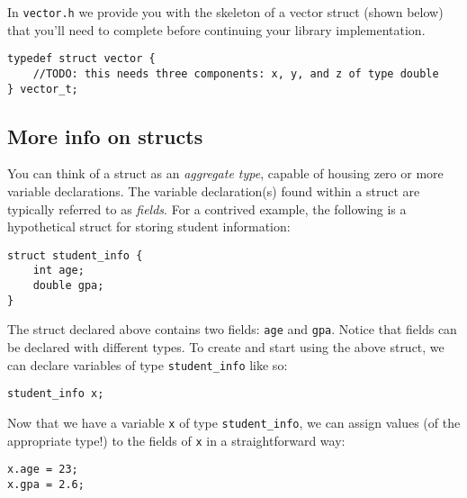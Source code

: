 \documentclass[12pt]{article}
\begin{document}
In \texttt{vector.h} we provide you with the skeleton of a vector struct (shown below) that you'll need to complete before continuing your library implementation.

\begin{mdframed}[backgroundcolor=light-gray, innerleftmargin=10, innertopmargin=1,innerbottommargin=1,linecolor=light-gray]
\begin{lstlisting}
typedef struct vector {
    //TODO: this needs three components: x, y, and z of type double
} vector_t;
\end{lstlisting}
\end{mdframed} 

\subsection{More info on structs}

You can think of a struct as an \textit{aggregate type}, capable of housing zero or more variable declarations. The variable declaration(s) found within a struct are typically referred to as \textit{fields}. For a contrived example, the following is a hypothetical struct for storing student information:

\begin{mdframed}[backgroundcolor=light-gray, innerleftmargin=10, innertopmargin=1,innerbottommargin=1,linecolor=light-gray]
\begin{lstlisting}
struct student_info {
    int age;
    double gpa;
}
\end{lstlisting}
\end{mdframed} 

The struct declared above contains two fields: \texttt{age} and \texttt{gpa}. Notice that fields can be  declared with different types. To create and start using the above struct, we can declare variables of type \texttt{student\_info} like so:
\begin{mdframed}[backgroundcolor=light-gray, innerleftmargin=10, innertopmargin=1,innerbottommargin=1,linecolor=light-gray]
\begin{lstlisting}
student_info x;
\end{lstlisting}
\end{mdframed} 
Now that we have a variable \texttt{x} of type \texttt{student\_info}, we can assign values (of the appropriate type!) to the fields of \texttt{x} in a straightforward way:

\begin{mdframed}[backgroundcolor=light-gray, innerleftmargin=10, innertopmargin=1,innerbottommargin=1,linecolor=light-gray]
\begin{lstlisting}
x.age = 23;
x.gpa = 2.6;
\end{lstlisting}
\end{mdframed}
\end{document}

